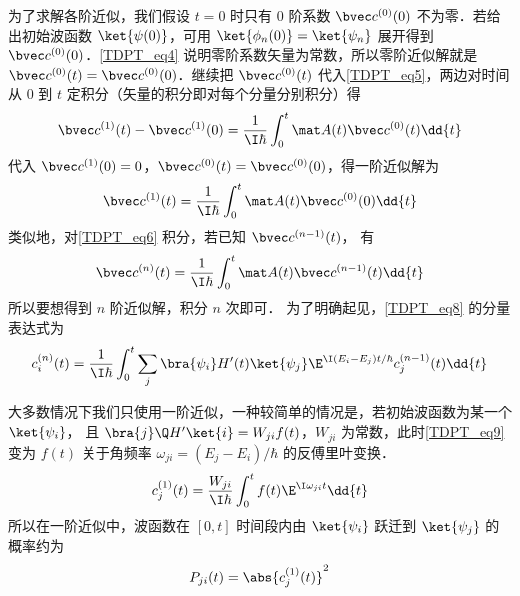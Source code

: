 为了求解各阶近似，我们假设 $t=0$ 时只有 0 阶系数 $\bvec c^{(0)}(0)$ 不为零．若给出初始波函数 $\ket{\psi(0)}$，可用 $\ket{\phi_n(0)} = \ket{\psi_n}$ 展开得到 $\bvec c^{(0)}(0)$．\autoref{TDPT_eq4} 说明零阶系数矢量为常数，所以零阶近似解就是 $\bvec c^{(0)}(t) = \bvec c^{(0)}(0)$．继续把 $\bvec c^{(0)}(t)$ 代入\autoref{TDPT_eq5}，两边对时间从 0 到 $t$ 定积分（矢量的积分即对每个分量分别积分）得
\begin{equation}
\bvec c^{(1)}(t) - \bvec c^{(1)}(0) = \frac{1}{\I\hbar} \int_{0}^{t}  \mat A(t) \bvec c^{(0)}(t) \dd{t}
\end{equation}
代入 $\bvec c^{(1)}(0) = 0$，$\bvec c^{(0)}(t) = \bvec c^{(0)}(0)$，得一阶近似解为
\begin{equation}\label{TDPT_eq9}
\bvec c^{(1)}(t) = \frac{1}{\I\hbar} \int_{0}^{t}  \mat A(t)\bvec c^{(0)}(0) \dd{t}
\end{equation}
类似地，对\autoref{TDPT_eq6} 积分，若已知 $\bvec c^{(n-1)}(t)$， 有
\begin{equation}\label{TDPT_eq8}
\bvec c^{(n)}(t) = \frac{1}{\I\hbar} \int_{0}^{t}  \mat A(t) \bvec c^{(n-1)}(t) \dd{t}
\end{equation}
所以要想得到 $n$ 阶近似解，积分 $n$ 次即可． 为了明确起见，\autoref{TDPT_eq8} 的分量表达式为
\begin{equation}
c_i^{(n)}(t) = \frac{1}{\I\hbar} \int_{0}^{t}  \sum_j \bra{\psi_i} H'(t)\ket{\psi_j} \E^{\I(E_i-E_j)t/\hbar} c_j^{(n-1)}(t) \dd{t}
\end{equation}

大多数情况下我们只使用一阶近似，一种较简单的情况是，若初始波函数为某一个 $\ket{\psi_i}$， 且 $\bra{j}\Q H'\ket{i} = W_{ji}f(t)$，$W_{ji}$ 为常数，此时\autoref{TDPT_eq9} 变为 $f(t)$ 关于角频率 $\omega_{ji} = (E_j-E_i)/\hbar$ 的反傅里叶变换．
\begin{equation}
c_j^{(1)}(t) = \frac{W_{ji}}{\I\hbar} \int_0^t f(t)\E^{\I\omega_{ji} t} \dd{t}
\end{equation}
所以在一阶近似中，波函数在 $[0,t]$ 时间段内由 $\ket{\psi_i}$ 跃迁到 $\ket{\psi_j}$ 的概率约为
\begin{equation}
P_{ji}(t) = \abs{c_j^{(1)}(t)}^2
\end{equation}

